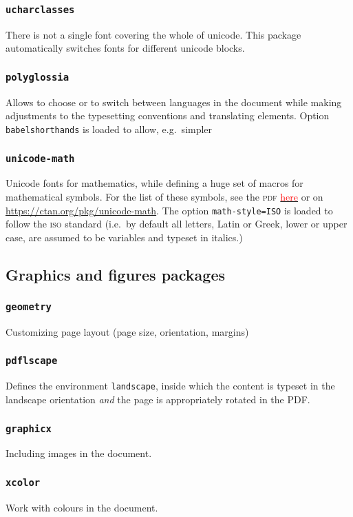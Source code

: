 \documentclass{article}
\begin{document}
\subsubsection{\texttt{ucharclasses}}
There is not a single font covering the whole of unicode. This package automatically switches fonts for different unicode blocks.
\subsubsection{\texttt{polyglossia}}
Allows to choose or to switch between languages in the document while making adjustments to the typesetting conventions and translating elements. Option \texttt{babelshorthands} is loaded to allow, e.g.\ simpler 
\subsubsection{\texttt{unicode-math}}
Unicode fonts for mathematics, while defining a huge set of macros for mathematical symbols. For the list of these symbols, see the \textsc{pdf} \href{http://mirrors.ctan.org/macros/unicodetex/latex/unicode-math/unimath-symbols.pdf}{\textcolor{red}{here}} or on \url{https://ctan.org/pkg/unicode-math}. The option \texttt{math-style=ISO} is loaded to follow the \textsc{iso} standard (i.e.\ by default all letters, Latin or Greek, lower or upper case, are assumed to be variables and typeset in italics.)



\subsection{Graphics and figures packages}
\subsubsection{\texttt{geometry}}
Customizing page layout (page size, orientation, margins)
\subsubsection{\texttt{pdflscape}}
Defines the environment \texttt{landscape}, inside which the content is typeset in the landscape orientation \emph{and} the page is appropriately rotated in the PDF.
\subsubsection{\texttt{graphicx}}
Including images  in the document.
\subsubsection{\texttt{xcolor}}
Work with colours in the document.
\end{document}
